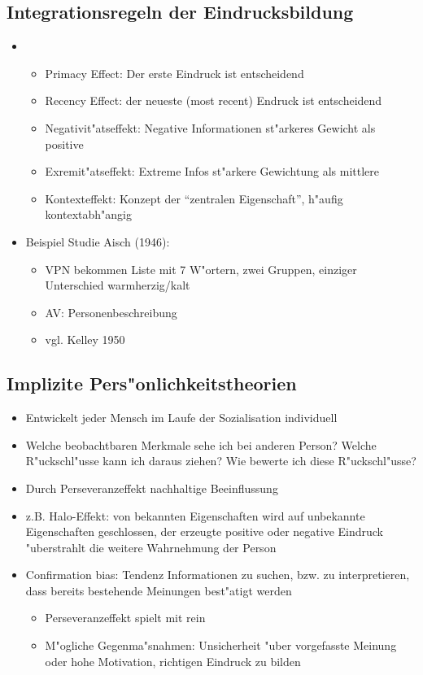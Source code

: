 \subsection{Integrationsregeln der Eindrucksbildung}
\begin{itemize}
	\item
		\begin{itemize}
			\item
				Primacy Effect: Der erste Eindruck ist entscheidend
			\item
				Recency Effect: der neueste (most recent) Endruck ist entscheidend
			\item
				Negativit"atseffekt: Negative Informationen st"arkeres Gewicht als positive
			\item
				Exremit"atseffekt: Extreme Infos st"arkere Gewichtung als mittlere
			\item
				Kontexteffekt: Konzept der \enquote{zentralen Eigenschaft}, h"aufig kontextabh"angig
		\end{itemize}
	\item
		Beispiel Studie Aisch (1946):
		\begin{itemize}
			\item
				VPN bekommen Liste mit 7 W"ortern, zwei Gruppen, einziger Unterschied warmherzig/kalt
			\item
				AV: Personenbeschreibung
			\item
				vgl. Kelley 1950
		\end{itemize}
\end{itemize}

\subsection{Implizite Pers"onlichkeitstheorien}
\begin{itemize}
	\item
		Entwickelt jeder Mensch im Laufe der Sozialisation individuell
	\item
		Welche beobachtbaren Merkmale sehe ich bei anderen Person? Welche R"uckschl"usse kann ich daraus ziehen? Wie bewerte ich diese R"uckschl"usse?
	\item
		Durch Perseveranzeffekt nachhaltige Beeinflussung
	\item
		z.B. Halo-Effekt: von bekannten Eigenschaften wird auf unbekannte Eigenschaften geschlossen, der erzeugte positive oder negative Eindruck "uberstrahlt die weitere Wahrnehmung der Person
	\item
		Confirmation bias: Tendenz Informationen zu suchen, bzw. zu interpretieren, dass bereits bestehende Meinungen best"atigt werden
		\begin{itemize}
			\item
				Perseveranzeffekt spielt mit rein
			\item
				M"ogliche Gegenma"snahmen: Unsicherheit "uber vorgefasste Meinung oder hohe Motivation, richtigen Eindruck zu bilden
		\end{itemize}
\end{itemize}
